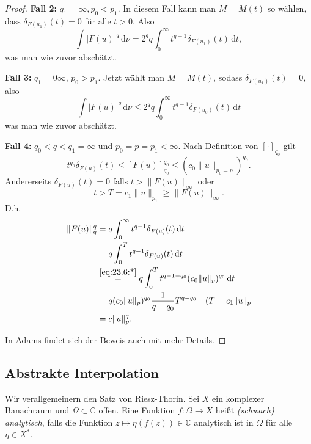 \documentclass[
paper=a4,
bibtotocnumbered,
liststotocnumbered,
tablecaptionabove,
pointlessnumbers,
twoside,
openright,
10pt
]
{report}
\theoremstyle{definition}
\numberwithin{equation}{chapter}
\begin{document}
\begin{proof}
\textbf{Fall 2:}  $q_1=\infty, p_0<p_1$. In diesem Fall kann man $M=M(t)$ so wählen, dass $\delta_{F(u_1)} (t) =0$ für alle $t>0$. Also
\begin{equation}
\int |F(u)|^q\, \mathrm d\nu = 2^q q \int_0^\infty t^{q-1} \delta_{F(u_1)} (t) \, \mathrm dt,
\end{equation}
was man wie zuvor abschätzt.

\textbf{Fall 3:} $q_1=0\infty$, $p_0>p_1$. Jetzt wählt man $M=M(t)$, sodass $\delta_{F(u_1)}(t)=0$, also
\begin{equation}
\int |F(u)|^q \, \mathrm d\nu \le 2^q q \int_0^\infty t^{q-1} \delta_{F(u_0)}(t)\, \mathrm dt
\end{equation}
was man wie zuvor abschätzt.

\textbf{Fall 4:} $q_0 < q <q_1 = \infty$ und $p_0=p=p_1<\infty$. Nach Definition von $[\cdot ]_{q_0}$ gilt
\begin{equation}\label{eq:23.6:*}
t^{q_0} \delta_{F(u)} (t) \le [ F(u)]_{q_0}^{q_0} \le ( c_0 \| u\|_{p_0=p} )^{q_0}.
\end{equation}
Andererseits $\delta_{F(u)}(t)=0$ falls $t> \| F(u)\|_\infty$ oder 
\begin{equation}
t>T = c_1 \| u\|_{p_1} \ge \| F(u) \|_\infty.
\end{equation}
D.h.
\begin{align}
\| F(u)\|^q_q &= q \int_0^\infty t^{q-1} \delta_{F(u)}(t) \, \mathrm dt\\
&= q \int_0^T t^{q-1} \delta_{F(u)} (t) \, \mathrm dt \\
&\stackrel{\eqref{eq:23.6:*}}= q \int_0^T t^{q-1-q_0} (c_0 \| u\|_p)^{q_0} \, \mathrm dt \\
&= q (c_0 \| u\|_p)^{q_0} \frac{1}{q-q_0} T^{q-q_0} \quad (T= c_1 \|u\|_p\\
&= c\|u\|_p^q.
\end{align}

In Adams findet sich der Beweis auch mit mehr Details.
\end{proof}

\subsection{Abstrakte Interpolation}
Wir verallgemeinern den Satz von Riesz-Thorin. Sei $X$ ein komplexer Banachraum und $\Omega \subset \mathbb C$ offen.  Eine Funktion $f: \Omega \to X$ heißt \emph{(schwach) analytisch}, falls die Funktion $z\mapsto \eta(f(z))\in \mathbb C$ analytisch ist in $\Omega$ für alle $\eta \in X^*$.
\end{document}
